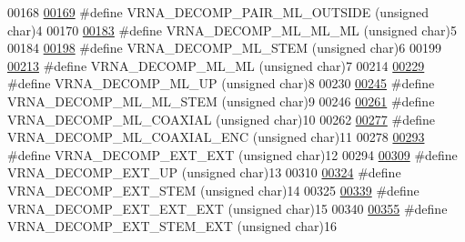 \begin{DoxyCode}
00168 
\mbox{\hyperlink{constraints_8h_afd422eca07368a955a78b08d7dd01265}{00169}} \textcolor{preprocessor}{#define VRNA\_DECOMP\_PAIR\_ML\_OUTSIDE     (unsigned char)4}
00170 
\mbox{\hyperlink{group__constraints_ga735517266f2e35e1374b8f1ea77ef23e}{00183}} \textcolor{preprocessor}{#define VRNA\_DECOMP\_ML\_ML\_ML    (unsigned char)5}
00184 
\mbox{\hyperlink{group__constraints_ga4a23054c75d8efc785de50e3ea87602f}{00198}} \textcolor{preprocessor}{#define VRNA\_DECOMP\_ML\_STEM     (unsigned char)6}
00199 
\mbox{\hyperlink{group__constraints_ga7f4cb9ff7a33e67f0539bd39e7b19a78}{00213}} \textcolor{preprocessor}{#define VRNA\_DECOMP\_ML\_ML       (unsigned char)7}
00214 
\mbox{\hyperlink{group__constraints_gae6478dda14e50e2f2cb9ef333a29256e}{00229}} \textcolor{preprocessor}{#define VRNA\_DECOMP\_ML\_UP       (unsigned char)8}
00230 
\mbox{\hyperlink{group__constraints_ga63d8ceb8c96ae3b463e529e28cc0fe98}{00245}} \textcolor{preprocessor}{#define VRNA\_DECOMP\_ML\_ML\_STEM (unsigned char)9}
00246 
\mbox{\hyperlink{group__constraints_ga4fe48d575830b16c208e280e01ab1497}{00261}} \textcolor{preprocessor}{#define VRNA\_DECOMP\_ML\_COAXIAL  (unsigned char)10}
00262 
\mbox{\hyperlink{group__constraints_ga0224727f7b8ad2f23eb0a3fd28d8b3fb}{00277}} \textcolor{preprocessor}{#define VRNA\_DECOMP\_ML\_COAXIAL\_ENC  (unsigned char)11}
00278 
\mbox{\hyperlink{group__constraints_ga437adf5115c1999304eff26b41e4c9b6}{00293}} \textcolor{preprocessor}{#define VRNA\_DECOMP\_EXT\_EXT     (unsigned char)12}
00294 
\mbox{\hyperlink{group__constraints_gaff1ddaffe86d984623910b40cc8a8717}{00309}} \textcolor{preprocessor}{#define VRNA\_DECOMP\_EXT\_UP      (unsigned char)13}
00310 
\mbox{\hyperlink{group__constraints_gae44b5ace0d9b4a29088069ecb4cec441}{00324}} \textcolor{preprocessor}{#define VRNA\_DECOMP\_EXT\_STEM (unsigned char)14}
00325 
\mbox{\hyperlink{group__constraints_ga803bd818b3f4b2b0a4a5cfa2f7dc2045}{00339}} \textcolor{preprocessor}{#define VRNA\_DECOMP\_EXT\_EXT\_EXT (unsigned char)15}
00340 
\mbox{\hyperlink{group__constraints_gabb09c5b78b75a44502fc77b950125c1e}{00355}} \textcolor{preprocessor}{#define VRNA\_DECOMP\_EXT\_STEM\_EXT (unsigned char)16}

\end{DoxyCode}
